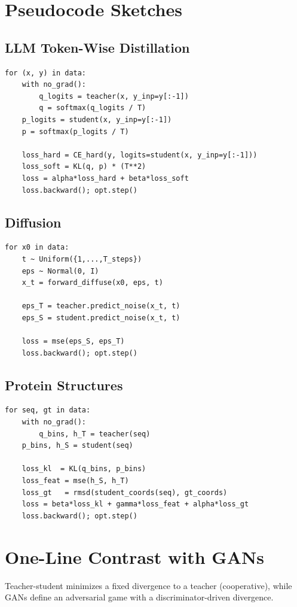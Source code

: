 \documentclass[11pt]{article}
\theoremstyle{remark}
\begin{document}
\section{Pseudocode Sketches}
\subsection{LLM Token-Wise Distillation}
\begin{verbatim}
for (x, y) in data:
    with no_grad():
        q_logits = teacher(x, y_inp=y[:-1])
        q = softmax(q_logits / T)
    p_logits = student(x, y_inp=y[:-1])
    p = softmax(p_logits / T)

    loss_hard = CE_hard(y, logits=student(x, y_inp=y[:-1]))
    loss_soft = KL(q, p) * (T**2)
    loss = alpha*loss_hard + beta*loss_soft
    loss.backward(); opt.step()
\end{verbatim}

\subsection{Diffusion}
\begin{verbatim}
for x0 in data:
    t ~ Uniform({1,...,T_steps})
    eps ~ Normal(0, I)
    x_t = forward_diffuse(x0, eps, t)

    eps_T = teacher.predict_noise(x_t, t)
    eps_S = student.predict_noise(x_t, t)

    loss = mse(eps_S, eps_T)
    loss.backward(); opt.step()
\end{verbatim}

\subsection{Protein Structures}
\begin{verbatim}
for seq, gt in data:
    with no_grad():
        q_bins, h_T = teacher(seq)
    p_bins, h_S = student(seq)

    loss_kl  = KL(q_bins, p_bins)
    loss_feat = mse(h_S, h_T)
    loss_gt   = rmsd(student_coords(seq), gt_coords)
    loss = beta*loss_kl + gamma*loss_feat + alpha*loss_gt
    loss.backward(); opt.step()
\end{verbatim}

\section*{One-Line Contrast with GANs}
Teacher-student minimizes a fixed divergence to a teacher (cooperative),
while GANs define an adversarial game with a discriminator-driven divergence.
\end{document}
